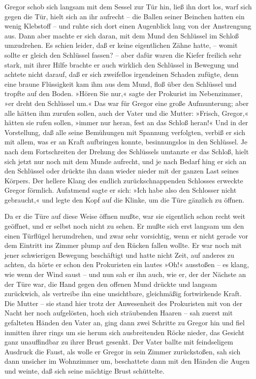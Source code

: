Gregor schob sich langsam mit dem Sessel zur Tür hin, ließ ihn dort los,
warf sich gegen die Tür, hielt sich an ihr aufrecht -- die Ballen seiner
Beinchen hatten ein wenig Klebstoff -- und ruhte sich dort einen
Augenblick lang von der Anstrengung aus. Dann aber machte er sich daran,
mit dem Mund den Schlüssel im Schloß umzudrehen. Es schien leider, daß
er keine eigentlichen Zähne hatte, -- womit sollte er gleich den
Schlüssel fassen? -- aber dafür waren die Kiefer freilich sehr stark,
mit ihrer Hilfe brachte er auch wirklich den Schlüssel in Bewegung und
achtete nicht darauf, daß er sich zweifellos irgendeinen Schaden
zufügte, denn eine braune Flüssigkeit kam ihm aus dem Mund, floß über
den Schlüssel und tropfte auf den Boden. »Hören Sie nur,« sagte der
Prokurist im Nebenzimmer, »er dreht den Schlüssel um.« Das war für
Gregor eine große Aufmunterung; aber alle hätten ihm zurufen sollen,
auch der Vater und die Mutter: »Frisch, Gregor,« hätten sie rufen
sollen, »immer nur heran, fest an das Schloß heran!« Und in der
Vorstellung, daß alle seine Bemühungen mit Spannung verfolgten, verbiß
er sich mit allem, was er an Kraft aufbringen konnte, besinnungslos in
den Schlüssel. Je nach dem Fortschreiten der Drehung des Schlüssels
umtanzte er das Schloß, hielt sich jetzt nur noch mit dem Munde
aufrecht, und je nach Bedarf hing er sich an den Schlüssel oder drückte
ihn dann wieder nieder mit der ganzen Last seines Körpers. Der hellere
Klang des endlich zurückschnappenden Schlosses erweckte Gregor förmlich.
Aufatmend sagte er sich: »Ich habe also den Schlosser nicht gebraucht,«
und legte den Kopf auf die Klinke, um die Türe gänzlich zu öffnen.

Da er die Türe auf diese Weise öffnen mußte, war sie eigentlich schon
recht weit geöffnet, und er selbst noch nicht zu sehen. Er mußte sich
erst langsam um den einen Türflügel herumdrehen, und zwar sehr
vorsichtig, wenn er nicht gerade vor dem Eintritt ins Zimmer plump auf
den Rücken fallen wollte. Er war noch mit jener schwierigen Bewegung
beschäftigt und hatte nicht Zeit, auf anderes zu achten, da hörte er
schon den Prokuristen ein lautes »Oh!« ausstoßen -- es klang, wie wenn
der Wind saust -- und nun sah er ihn auch, wie er, der der Nächste an
der Türe war, die Hand gegen den offenen Mund drückte und langsam
zurückwich, als vertreibe ihn eine unsichtbare, gleichmäßig fortwirkende
Kraft. Die Mutter -- sie stand hier trotz der Anwesenheit des
Prokuristen mit von der Nacht her noch aufgelösten, hoch sich
sträubenden Haaren -- sah zuerst mit gefalteten Händen den Vater an,
ging dann zwei Schritte zu Gregor hin und fiel inmitten ihrer rings um
sie herum sich ausbreitenden Röcke nieder, das Gesicht ganz unauffindbar
zu ihrer Brust gesenkt. Der Vater ballte mit feindseligem Ausdruck die
Faust, als wolle er Gregor in sein Zimmer zurückstoßen, sah sich dann
unsicher im Wohnzimmer um, beschattete dann mit den Händen die Augen und
weinte, daß sich seine mächtige Brust schüttelte.

